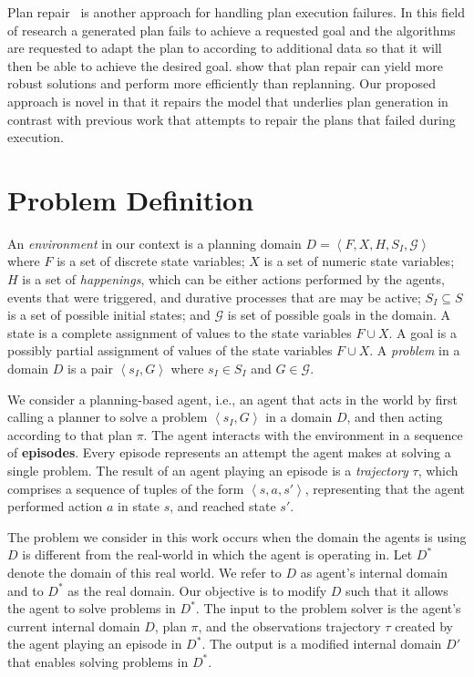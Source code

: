 \documentclass[letterpaper]{article} %
\newcommand{\tuple}[1]{\ensuremath{\left \langle #1 \right \rangle }} %
\begin{document}
Plan repair~\cite{myers1999cpef, bidot2008plan, komenda2014domain} is another approach for handling plan execution failures. In this field of research a generated plan fails to achieve a requested goal and the algorithms are requested to adapt the plan to according to additional data so that it will then be able to achieve the desired goal. \cite{fox2006plan} show that plan repair can yield more robust solutions and perform more efficiently than replanning.
Our proposed approach is novel in that it repairs the model that underlies plan generation in contrast with previous work that attempts to repair the plans that failed during execution.



\section{Problem Definition}

An \emph{environment} in our context is a planning domain $D=\tuple{F, X, H, S_I, \mathcal{G}}$ where
$F$ is a set of discrete state variables;
$X$ is a set of numeric state variables;
$H$ is a set of \emph{happenings}, which can be either actions performed by the agents, events that were triggered, and durative processes that are may be active;
$S_I\subseteq S$ is a set of possible initial states;
and  $\mathcal{G}$ is set of possible goals in the domain.
A state is a complete assignment of values to the state variables $F\cup X$.
A goal is a possibly partial assignment of values of the state variables $F\cup X$.
A \emph{problem} in a domain $D$ is a pair $\tuple{s_I, G}$ where $s_I\in S_I$ and $G\in \mathcal{G}$.


We consider a planning-based agent, i.e., an agent that acts in the world by first calling a planner to solve a problem $\tuple{s_I, G}$ in a domain $D$, and then acting according to that plan $\pi$.
The agent interacts with the environment in a sequence of \textbf{episodes}.
Every episode represents an attempt the agent makes at solving a single problem.
The result of an agent playing an episode is a \emph{trajectory} $\tau$, which comprises a sequence of tuples of the form $\tuple{s, a, s'}$, representing that the agent performed action $a$ in state $s$, and reached state $s'$.


The problem we consider in this work occurs when the domain the agents is using $D$ is different from the real-world in which the agent is operating in. Let $D^*$ denote the domain of this real world. We refer to $D$ as agent's internal domain and to $D^*$ as the real domain. Our objective is to modify $D$ such that it allows the agent to solve problems in $D^*$.
The input to the problem solver is the agent's current internal domain $D$, plan $\pi$, and the observations trajectory $\tau$ created by the agent playing an episode in $D^*$.
The output is a modified internal domain $D'$ that enables solving problems in $D^*$.
\end{document}
